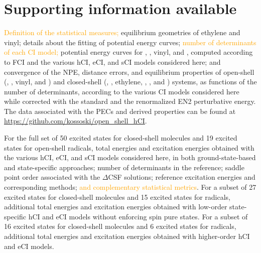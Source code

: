 \documentclass[aip,jcp,reprint,noshowkeys,superscriptaddress]{revtex4-1}
\newcommand{\fk}[1]{\textcolor{orange}{#1}}
\begin{document}
\section*{Supporting information available}
\label{sec:SI}

\fk{Definition of the statistical measures;}
equilibrium geometries of ethylene and vinyl; details about the fitting of potential energy curves;
\fk{number of determinants of each CI model;}
potential energy curves for , , vinyl, and ,
computed according to FCI and the various hCI, eCI, and sCI models considered here;
and convergence of the NPE, distance errors, and equilibrium properties of
open-shell (, , vinyl, and )
and closed-shell (, , ethylene, , , and ) systems,
as functions of the number of determinants, according to the various CI models considered here while
corrected with the standard and the renormalized EN2 perturbative energy.
The data associated with the PECs and derived properties can be found at \url{https://github.com/kossoski/open_shell_hCI}.

For the full set of 50 excited states for closed-shell molecules and 19 excited states for open-shell radicals,
total energies and excitation energies obtained with
the various hCI, eCI, and sCI models considered here, in both ground-state-based and state-specific approaches;
number of determinants in the reference; saddle point order associated with the $\Delta$CSF solutions;
reference excitation energies and corresponding methods;
\fk{and complementary statistical metrics}.
For a subset of 27 excited states for closed-shell molecules and 15 excited states for radicals,
additional total energies and excitation energies obtained with low-order state-specific hCI and eCI models without enforcing spin pure states.
For a subset of 16 excited states for closed-shell molecules and 6 excited states for radicals,
additional total energies and excitation energies obtained with higher-order hCI and eCI models.

\end{document}
